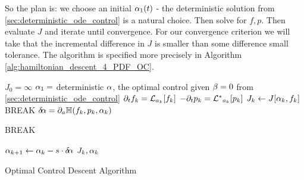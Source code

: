 \documentclass{article}
\begin{document}
So the plan is: we choose an initial ${\alpha}_1(t)$ - the deterministic solution
from \cref{sec:deterministic_ode_control} is a natural choice. Then solve for $f,p$.
Then evaluate $J$ and iterate until convergence. For our convergence
criterion we will take that the incremental difference in $J$ is smaller than
some difference small tolerance. The algorithm is specified more
precisely in Algorithm \ref{alg:hamiltonian_descent_4_PDF_OC}.
\begin{algorithm}
\begin{algorithmic}
\State $J_0 = \infty $ 
\State ${\alpha}_1 = $ deterministic ${\alpha}$, the optimal control given ${\beta}=0$ from
\cref{sec:deterministic_ode_control}
	\State ${\partial}_t f_{k} = { \mathcal{L} }_{a_{k}} [ f_{k}]$
	\State $-{\partial}_t p_{k} = { { \mathcal{L} }^* }_{a_{k}} [ p_{k}]$
	\State $J_{k} \gets J[{\alpha}_k, f_k]$
		\State BREAK
	\EndIf
	\State ${ \delta\! {\alpha}} = {\partial}_a { \mathbb{H}}(f_{k} ,p_{k},  {\alpha}_{k})$

		\State BREAK
	\EndIf

	\State ${\alpha}_{k+1} \gets {\alpha}_{k} - s \cdot { \delta\! {\alpha}}  $
\EndFor
\State \Return $J_k, {\alpha}_k$
\end{algorithmic}
\caption{Optimal Control Descent Algorithm}
\label{alg:hamiltonian_descent_4_PDF_OC}
\end{algorithm}
\end{document}
